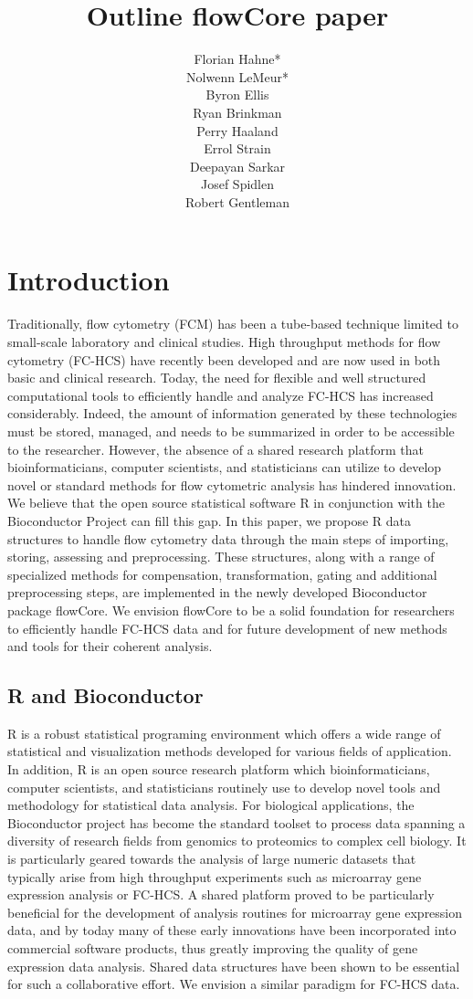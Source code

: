 \documentclass[12pt]{article}
\title{Outline flowCore paper}
\author{Florian Hahne*\\
  Nolwenn LeMeur*\\
  Byron Ellis\\
  Ryan Brinkman\\
  Perry Haaland\\
  Errol Strain\\
  Deepayan Sarkar\\
  Josef Spidlen\\
  Robert Gentleman
 }
\begin{document}
\maketitle

\section*{Introduction}
Traditionally, flow cytometry (FCM) has been a tube-based technique
limited to small-scale laboratory and clinical studies.  High
throughput methods for flow cytometry (FC-HCS) have recently been
developed and are now used in both basic and clinical research. Today,
the need for flexible and well structured computational tools to
efficiently handle and analyze FC-HCS has increased
considerably. Indeed, the amount of information generated by these
technologies must be stored, managed, and needs to be summarized in
order to be accessible to the researcher. However, the absence of a
shared research platform that bioinformaticians, computer scientists,
and statisticians can utilize to develop novel or standard methods for
flow cytometric analysis has hindered innovation. We believe that the
open source statistical software R in conjunction with the
Bioconductor Project can fill this gap.  In this paper, we propose R
data structures to handle flow cytometry data through the main steps
of importing, storing, assessing and preprocessing. These structures,
along with a range of specialized methods for compensation,
transformation, gating and additional preprocessing steps, are
implemented in the newly developed Bioconductor package flowCore.  We
envision flowCore to be a solid foundation for researchers to
efficiently handle FC-HCS data and for future development of new
methods and tools for their coherent analysis.


\subsection*{R and Bioconductor}
R is a robust statistical programing environment which offers a wide
range of statistical and visualization methods developed for various
fields of application. In addition, R is an open source research
platform which bioinformaticians, computer scientists, and
statisticians routinely use to develop novel tools and methodology for
statistical data analysis. For biological applications, the
Bioconductor project has become the standard toolset
\citep{gentleman2006bos} to process data spanning a diversity of
research fields from genomics to proteomics to complex cell
biology. It is particularly geared towards the analysis of large
numeric datasets that typically arise from high throughput experiments
such as microarray gene expression analysis or FC-HCS. A shared
platform proved to be particularly beneficial for the development of
analysis routines for microarray gene expression data, and by today
many of these early innovations have been incorporated into commercial
software products, thus greatly improving the quality of gene
expression data analysis. Shared data structures have been shown to be
essential for such a collaborative effort. We envision a similar
paradigm for FC-HCS data.
\end{document}
